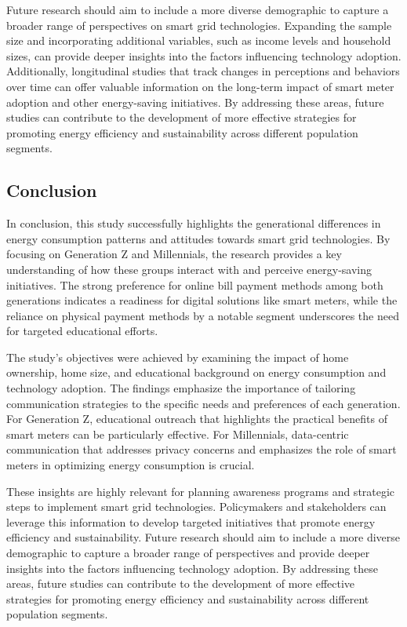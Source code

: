 \documentclass[
  letterpaper,
  DIV=11,
  numbers=noendperiod]{scrartcl}
\begin{document}
Future research should aim to include a more diverse demographic to
capture a broader range of perspectives on smart grid technologies.
Expanding the sample size and incorporating additional variables, such
as income levels and household sizes, can provide deeper insights into
the factors influencing technology adoption. Additionally, longitudinal
studies that track changes in perceptions and behaviors over time can
offer valuable information on the long-term impact of smart meter
adoption and other energy-saving initiatives. By addressing these areas,
future studies can contribute to the development of more effective
strategies for promoting energy efficiency and sustainability across
different population segments.

\subsection{Conclusion}\label{conclusion}

In conclusion, this study successfully highlights the generational
differences in energy consumption patterns and attitudes towards smart
grid technologies. By focusing on Generation Z and Millennials, the
research provides a key understanding of how these groups interact with
and perceive energy-saving initiatives. The strong preference for online
bill payment methods among both generations indicates a readiness for
digital solutions like smart meters, while the reliance on physical
payment methods by a notable segment underscores the need for targeted
educational efforts.

The study's objectives were achieved by examining the impact of home
ownership, home size, and educational background on energy consumption
and technology adoption. The findings emphasize the importance of
tailoring communication strategies to the specific needs and preferences
of each generation. For Generation Z, educational outreach that
highlights the practical benefits of smart meters can be particularly
effective. For Millennials, data-centric communication that addresses
privacy concerns and emphasizes the role of smart meters in optimizing
energy consumption is crucial.

These insights are highly relevant for planning awareness programs and
strategic steps to implement smart grid technologies. Policymakers and
stakeholders can leverage this information to develop targeted
initiatives that promote energy efficiency and sustainability. Future
research should aim to include a more diverse demographic to capture a
broader range of perspectives and provide deeper insights into the
factors influencing technology adoption. By addressing these areas,
future studies can contribute to the development of more effective
strategies for promoting energy efficiency and sustainability across
different population segments.
\end{document}
